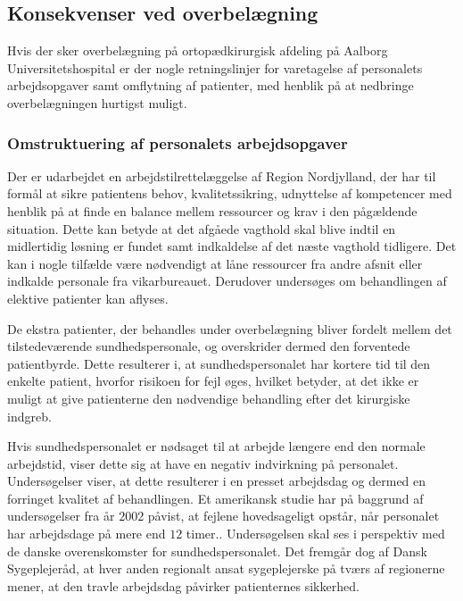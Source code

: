 \subsection{Konsekvenser ved overbelægning}
Hvis der sker overbelægning på ortopædkirurgisk afdeling på Aalborg Universitetshospital er der nogle retningslinjer for varetagelse af personalets arbejdsopgaver samt omflytning af patienter, med henblik på at nedbringe overbelægningen hurtigst muligt.

\subsubsection{Omstruktuering af personalets arbejdsopgaver} \label{Tilret}
Der er udarbejdet en arbejdstilrettelæggelse af Region Nordjylland, der har til formål at sikre patientens behov, kvalitetssikring, udnyttelse af kompetencer med henblik på at finde en balance mellem ressourcer og krav i den pågældende situation. Dette kan betyde at det afgåede vagthold skal blive indtil en midlertidig løsning er fundet samt indkaldelse af det næste vagthold tidligere. Det kan i nogle tilfælde være nødvendigt at låne ressourcer fra andre afsnit eller indkalde personale fra vikarbureauet. Derudover undersøges om behandlingen af elektive patienter kan aflyses.\cite{Bjerg2016}

De ekstra patienter, der behandles under overbelægning bliver fordelt mellem det tilstedeværende sundhedspersonale, og overskrider dermed den forventede patientbyrde. Dette resulterer i, at sundhedspersonalet har kortere tid til den enkelte patient, hvorfor risikoen for fejl øges, hvilket betyder, at det ikke er muligt at give patienterne den nødvendige behandling efter det kirurgiske indgreb.\cite{Dinges2004,Aiken2002} 

Hvis sundhedspersonalet er nødsaget til at arbejde længere end den normale arbejdstid, viser dette sig at have en negativ indvirkning på personalet.\cite{Kjeldsen2015,Dinges2004} Undersøgelser viser, at dette resulterer i en presset arbejdsdag og dermed en forringet kvalitet af behandlingen.\cite{Kjeldsen2015} Et amerikansk studie har på baggrund af undersøgelser fra år $2002$ påvist, at fejlene hovedsageligt opstår, når personalet har arbejdsdage på mere end $12$ timer.\cite{Dinges2004}. Undersøgelsen skal ses i perspektiv med de danske overenskomster for sundhedspersonalet. Det fremgår dog af Dansk Sygeplejeråd, at hver anden regionalt ansat sygeplejerske på tværs af regionerne mener, at den travle arbejdsdag påvirker patienternes sikkerhed.\cite{Kjeldsen2015}

